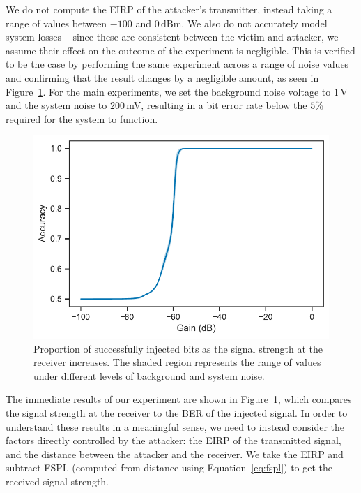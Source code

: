 We do not compute the EIRP of the attacker's transmitter, instead taking a range of values between $-100$ and $0$\,dBm.
We also do not accurately model system losses -- since these are consistent between the victim and attacker, we assume their effect on the outcome of the experiment is negligible.
This is verified to be the case by performing the same experiment across a range of noise values and confirming that the result changes by a negligible amount, as seen in Figure~\ref{fig:overshadowing_accuracy}.
For the main experiments, we set the background noise voltage to $1\,$\textmu V and the system noise to $200$\,mV, resulting in a bit error rate below the $5$\% required for the system to function.

\begin{figure}
    \centering
    \includegraphics[width=\columnwidth]{diagrams/overshadowing_accuracy.pdf}
    \caption{Proportion of successfully injected bits as the signal strength at the receiver increases. The shaded region represents the range of values under different levels of background and system noise.}
    \label{fig:overshadowing_accuracy}
\end{figure}

The immediate results of our experiment are shown in Figure~\ref{fig:overshadowing_accuracy}, which compares the signal strength at the receiver to the BER of the injected signal.
In order to understand these results in a meaningful sense, we need to instead consider the factors directly controlled by the attacker: the EIRP of the transmitted signal, and the distance between the attacker and the receiver.
We take the EIRP and subtract FSPL (computed from distance using Equation~\ref{eq:fspl}) to get the received signal strength.

